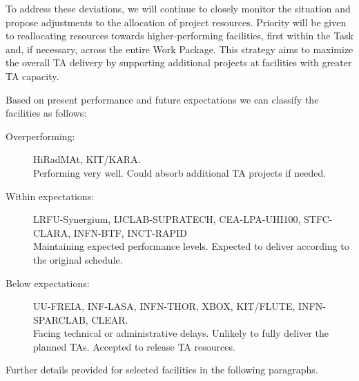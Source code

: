 {To address these deviations, we will continue to closely monitor the situation and propose adjustments to the allocation of project resources. Priority will be given to reallocating resources towards higher-performing facilities, first within the Task and, if necessary, across the entire Work Package. This strategy aims to maximize the overall TA delivery by supporting additional projects at facilities with greater TA capacity.

Based on present performance and future expectations we can classify the facilities as follows:
\begin{description}
    \item[Overperforming:] HiRadMAt, KIT/KARA. \\
        Performing very well. Could absorb additional TA projects if needed.
    \item[Within expectations:] LRFU-Synergium, IJCLAB-SUPRATECH, CEA-LPA-UHI100, STFC-CLARA, INFN-BTF, INCT-RAPID \\
        Maintaining expected performance levels. Expected to deliver according to the original schedule. 
    \item[Below expectations:] UU-FREIA, INF-LASA, INFN-THOR, XBOX, KIT/FLUTE, INFN-SPARCLAB, CLEAR. \\
        Facing technical or administrative delays. Unlikely to fully deliver the planned TAs. Accepted to release TA resources.
\end{description}
Further details provided for selected facilities in the following paragraphs.

    
}
